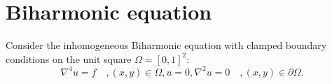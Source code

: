 \section{Biharmonic equation}
\label{sec:PDE}

\newtheorem{theorem}{Theorem}
\newtheorem{lemma}{Lemma}
\theoremstyle{remark}
\newtheorem*{remark}{Remark}

\theoremstyle{definition}
\newtheorem{definition}{Definition}

Consider the inhomogeneous Biharmonic equation with clamped boundary conditions on the unit square $\Omega = [0, 1]^2$:
\begin{subequations}\label{eq:PDE}
  \begin{equation}
    \nabla^4 u = f \quad, (x, y) \in \Omega,
  \end{equation}
  \begin{equation}
    u = 0, \nabla^2u = 0 \quad, (x, y) \in \partial\Omega.
  \end{equation}
\end{subequations}

